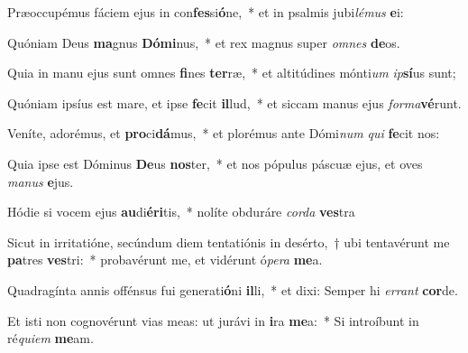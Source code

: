 \item Præoccupémus fáciem ejus in con\textbf{fes}si\textbf{ó}ne,~* et in psalmis jubi\textit{lé}\textit{mus} \textbf{e}i:
\item Quóniam Deus \textbf{ma}gnus \textbf{Dó}\textbf{mi}nus,~* et rex magnus super \textit{om}\textit{nes} \textbf{de}os.
\item Quia in manu ejus sunt omnes \textbf{fi}nes \textbf{ter}ræ,~* et altitúdines mónti\textit{um} \textit{ip}\textbf{sí}us sunt;
\item Quóniam ipsíus est mare, et ipse \textbf{fe}cit \textbf{il}lud,~* et siccam manus ejus \textit{for}\textit{ma}\textbf{vé}runt.
\item Veníte, adorémus, et \textbf{pro}ci\textbf{dá}mus,~* et plorémus ante Dómi\textit{num} \textit{qui} \textbf{fe}cit nos:
\item Quia ipse est Dóminus \textbf{De}us \textbf{nos}ter,~* et nos pópulus páscuæ ejus, et oves \textit{ma}\textit{nus} \textbf{e}jus.
\item Hódie si vocem ejus \textbf{au}di\textbf{é}\textbf{ri}tis,~* nolíte obduráre \textit{cor}\textit{da} \textbf{ves}tra
\item Sicut in irritatióne, secúndum diem tentatiónis in desérto,~† ubi tentavérunt me \textbf{pa}tres \textbf{ves}tri:~* probavérunt me, et vidérunt ó\textit{pe}\textit{ra} \textbf{me}a.
\item Quadragínta annis offénsus fui generati\textbf{ó}ni \textbf{il}li,~* et dixi: Semper hi \textit{er}\textit{rant} \textbf{cor}de.
\item Et isti non cognovérunt vias meas: ut jurávi in \textbf{i}ra \textbf{me}a:~* Si introíbunt in ré\textit{qui}\textit{em} \textbf{me}am.
